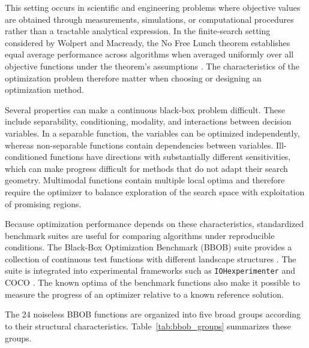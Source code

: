 This setting occurs in scientific and engineering problems where objective
values are obtained through measurements, simulations, or computational
procedures rather than a tractable analytical expression. In the finite-search
setting considered by Wolpert and Macready, the No Free Lunch theorem
establishes equal average performance across algorithms when averaged
uniformly over all objective functions under the theorem's assumptions \cite{Wolpert1997}. The
characteristics of the optimization problem therefore matter when choosing
or designing an optimization method.

Several properties can make a continuous black-box problem difficult. These
include separability, conditioning, modality, and interactions between
decision variables. In a separable function, the variables can be optimized
independently, whereas non-separable functions contain dependencies between
variables. Ill-conditioned functions have directions with substantially
different sensitivities, which can make progress difficult for methods that do
not adapt their search geometry. Multimodal functions contain multiple local
optima and therefore require the optimizer to balance exploration of the
search space with exploitation of promising regions.

Because optimization performance depends on these characteristics,
standardized benchmark suites are useful for comparing algorithms under
reproducible conditions. The Black-Box Optimization Benchmark (BBOB) suite
provides a collection of continuous test functions with different landscape
structures \cite{BBOB2009}. The suite is integrated into experimental
frameworks such as \texttt{IOHexperimenter} \cite{deNobel2024} and COCO
\cite{Hansen2021COCO}. The known optima of the benchmark functions also make
it possible to measure the progress of an optimizer relative to a known
reference solution.

The 24 noiseless BBOB functions are organized into five broad groups according
to their structural characteristics. Table~\ref{tab:bbob_groups} summarizes
these groups.

